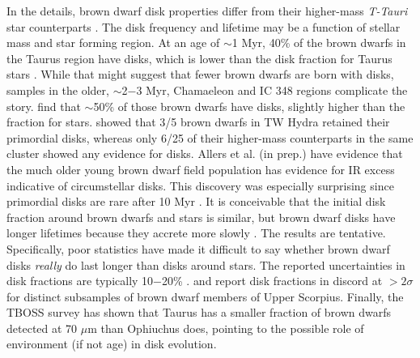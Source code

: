 In the details, brown dwarf disk properties differ from their higher-mass \emph{T-Tauri} star counterparts \citep{2009ApJ...696..143P}.  The disk frequency and lifetime may be a function of stellar mass and star forming region.  At an age of $\sim$1 Myr, 40\% of the brown dwarfs in the Taurus region have disks, which is lower than the disk fraction for Taurus stars \citep{2006ApJ...645..676L}.  While that might suggest that fewer brown dwarfs are born with disks, samples in the older, $\sim$2$-$3 Myr, Chamaeleon and IC 348 regions complicate the story.  \cite{2005ApJ...631L..69L} find that $\sim$50\% of those brown dwarfs have disks, slightly higher than the fraction for stars.  \citet{2008ApJ...681.1584R} showed that 3/5 brown dwarfs in TW Hydra retained their primordial disks, whereas only 6/25 of their higher-mass counterparts in the same cluster showed any evidence for disks.  Allers et al. (in prep.) have evidence that the much older young brown dwarf field population has evidence for IR excess indicative of circumstellar disks.  This discovery was especially surprising since primordial disks are rare after 10 Myr \citep{2011ARA&A..49...67W}.  It is conceivable that the initial disk fraction around brown dwarfs and stars is similar, but brown dwarf disks have longer lifetimes because they accrete more slowly \citep{2007ApJ...657..511A}.  The results are tentative.  Specifically, poor statistics have made it difficult to say whether brown dwarf disks \emph{really} do last longer than disks around stars.  The reported uncertainties in disk fractions are typically 10$-$20\% \citep{2012MNRAS.420.2497R}.  \citet{2007ApJ...660.1517S} and \citet{2009ApJ...705.1173R} report disk fractions in discord at $>2\sigma$ for distinct subsamples of brown dwarf members of Upper Scorpius.  Finally, the TBOSS survey has shown that Taurus has a smaller fraction of brown dwarfs detected at 70 $\mu$m than Ophiuchus does, pointing to the possible role of environment (if not age) in disk evolution. \citep{2014A&A...570A..29B}

